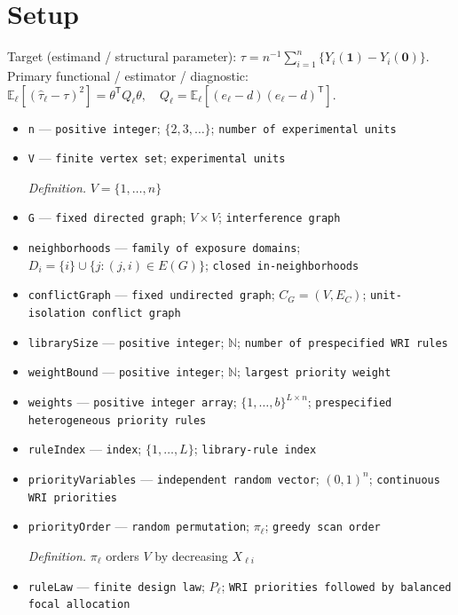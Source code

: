 \documentclass{article}
\begin{document}
\section{Setup}

Target (estimand / structural parameter): \(\tau=n^{-1}\sum_{i=1}^n\{Y_i(\mathbf 1)-Y_i(\mathbf 0)\}\).
Primary functional / estimator / diagnostic: \(\mathbb E_{\ell}[(\widehat\tau_{\ell}-\tau)^2]=\theta^{\mathsf T}Q_{\ell}\theta,\quad Q_{\ell}=\mathbb E_{\ell}[(e_{\ell}-d)(e_{\ell}-d)^{\mathsf T}]\).
\begin{itemize}
  \item \texttt{n} --- \texttt{positive integer}; \(\{2,3,\ldots\}\); \texttt{number of experimental units}
  \item \texttt{V} --- \texttt{finite vertex set}; \texttt{experimental units}
  \par\smallskip\noindent\emph{Definition.} \(V=\{1,\ldots,n\}\)
  \item \texttt{G} --- \texttt{fixed directed graph}; \(V\times V\); \texttt{interference graph}
  \item \texttt{neighborhoods} --- \texttt{family of exposure domains}; \(D_i=\{i\}\cup\{j:(j,i)\in E(G)\}\); \texttt{closed in-\allowbreak{}neighborhoods}
  \item \texttt{conflictGraph} --- \texttt{fixed undirected graph}; \(C_G=(V,E_C)\); \texttt{unit-\allowbreak{}isolation conflict graph}
  \item \texttt{librarySize} --- \texttt{positive integer}; \(\mathbb N\); \texttt{number of prespecified WRI rules}
  \item \texttt{weightBound} --- \texttt{positive integer}; \(\mathbb N\); \texttt{largest priority weight}
  \item \texttt{weights} --- \texttt{positive integer array}; \(\{1,\ldots,b\}^{L\times n}\); \texttt{prespecified heterogeneous priority rules}
  \item \texttt{ruleIndex} --- \texttt{index}; \(\{1,\ldots,L\}\); \texttt{library-\allowbreak{}rule index}
  \item \texttt{priorityVariables} --- \texttt{independent random vector}; \((0,1)^n\); \texttt{continuous WRI priorities}
  \item \texttt{priorityOrder} --- \texttt{random permutation}; \(\pi_{\ell}\); \texttt{greedy scan order}
  \par\smallskip\noindent\emph{Definition.} \(\pi_{\ell}\) orders \(V\) by decreasing \(X_{\ell i}\)
  \item \texttt{ruleLaw} --- \texttt{finite design law}; \(P_{\ell}\); \texttt{WRI priorities followed by balanced focal allocation}

\end{itemize}
\end{document}

